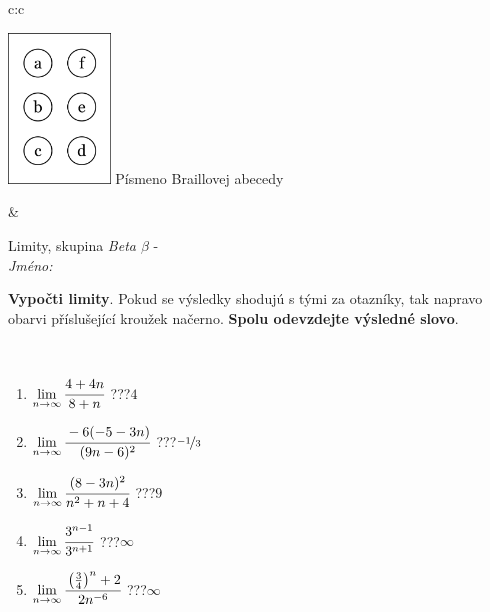\documentclass[10pt]{report}
\begin{document}
\begin{tabular}{c:c}
\begin{minipage}[c][104.5mm][t]{0.5\linewidth}
\begin{center}
\begin{minipage}{0.20\linewidth}
\begin{center}
\includegraphics[height=40mm]{../images/braille.png}
{\small Písmeno Braillovej abecedy}
\end{center}
\end{minipage}
\end{center}
\end{minipage}
&
\begin{minipage}[c][104.5mm][t]{0.5\linewidth}
\begin{center}
\vspace{7mm}
{\huge Limity, skupina \textit{Beta $\beta$} -}\\[5mm]
\textit{Jméno:}\phantom{xxxxxxxxxxxxxxxxxxxxxxxxxxxxxxxxxxxxxxxxxxxxxxxxxxxxxxxxxxxxxxxxx}\\[5mm]
\begin{minipage}{0.95\linewidth}
\begin{center}
\textbf{Vypočti limity}. Pokud se výsledky shodujú s tými za otazníky, tak napravo\\obarvi příslušející kroužek načerno. \textbf{Spolu odevzdejte výsledné slovo}.
\end{center}
\end{minipage}
\\[1mm]
\begin{minipage}{0.79\linewidth}
\begin{center}
\begin{varwidth}{\linewidth}
\begin{enumerate}
\normalsize
\item $\lim\limits_{n\to\infty}\cfrac{4+4n}{8+n}$\quad \dotfill\; ???\;\dotfill \quad $4$
\item $\lim\limits_{n\to\infty}\cfrac{-6(-5-3n)}{(9n-6)^2}$\quad \dotfill\; ???\;\dotfill \quad $\nicefrac{-1}{3}$
\item $\lim\limits_{n\to\infty}\cfrac{(8-3n)^2}{n^2+n+4}$\quad \dotfill\; ???\;\dotfill \quad $9$
\item $\lim\limits_{n\to\infty}\cfrac{3^{n-1}}{3^{n+1}}$\quad \dotfill\; ???\;\dotfill \quad $\infty$
\item $\lim\limits_{n\to\infty}\cfrac{\left(\frac{3}{4}\right)^n +2}{2n^{-6}}$\quad \dotfill\; ???\;\dotfill \quad $\infty$

\end{enumerate}
\end{varwidth}
\end{center}
\end{minipage}
\end{center}
\end{minipage}
\end{tabular}
\end{document}
